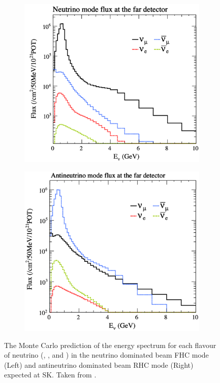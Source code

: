 \begin{figure}[h]
  \begin{subfigure}[t]{0.45\textwidth}
    \includegraphics[width=\textwidth, trim={0mm 0mm 0mm 0mm}, clip,page=1]{Figures/Detectors/T2KFluxInNuMode.pdf}
  \end{subfigure}%
  \begin{subfigure}[t]{0.45\textwidth}
    \includegraphics[width=\textwidth, trim={0mm 0mm 0mm 0mm}, clip,page=1]{Figures/Detectors/T2KFluxInANuMode.pdf}
  \end{subfigure}
  \caption{The Monte Carlo prediction of the energy spectrum for each flavour of neutrino (, , \quickmath{\nu_\mu} and \quickmath{\bar{\nu}_\mu}) in the neutrino dominated beam FHC mode (Left) and antineutrino dominated beam RHC mode (Right) expected at SK. Taken from \cite{Abe2021-tr}.}
  \label{fig:T2KSKExp_T2K_NuFluxPerMode}
\end{figure}

